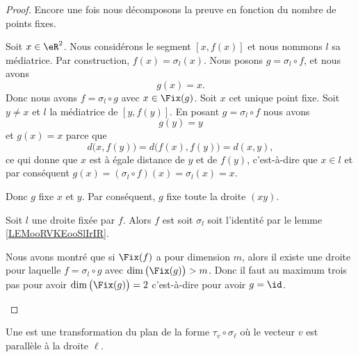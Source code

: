 \begin{proof}
	Encore une fois nous décomposons la preuve en fonction du nombre de points fixes.
	\begin{subproof}
		Soit \( x\in \eR^2\). Nous considérons le segment \( [x,f(x)]\) et nous nommons \( l\) sa médiatrice. Par construction, \( f(x)=\sigma_l(x)\). Nous posons \( g=\sigma_l\circ f\), et nous avons
		\begin{equation}
			g(x)=x.
		\end{equation}
		Donc nous avons \( f=\sigma_l\circ g\) avec \( x\in\Fix(g)\).
		Soit \( x\) cet unique point fixe. Soit \( y\neq x\) et \( l\) la médiatrice de \( [y,f(y)]\). En posant \( g=\sigma_l\circ f\) nous avons
		\begin{equation}
			g(y)=y
		\end{equation}
		et \( g(x)=x\) parce que
		\begin{equation}
			d\big( x,f(y) \big)=d\big( f(x),f(y) \big)=d(x,y),
		\end{equation}
		ce qui donne que \( x\) est à égale distance de \( y\) et de \( f(y)\), c'est-à-dire que \( x\in l\) et par conséquent \( g(x)=(\sigma_l\circ f)(x)=\sigma_l(x)=x\).

		Donc \( g\) fixe \( x\) et \( y\). Par conséquent, \( g\) fixe toute la droite \( (xy)\).

		Soit \( l\) une droite fixée par \( f\). Alors \( f\) est soit \( \sigma_l\) soit l'identité par le lemme \ref{LEMooRVKEooSlIrIR}.

		\spitem[Conclusion]

		Nous avons montré que si \( \Fix(f)\) a pour dimension \( m\), alors il existe une droite pour laquelle \( f=\sigma_l\circ g\) avec \( \dim\big( \Fix(g) \big)>m\). Donc il faut au maximum trois pas pour avoir \( \dim\big( \Fix(g) \big)=2\) c'est-à-dire pour avoir \( g=\id\).
	\end{subproof}
\end{proof}

\begin{definition}      \label{DEFooJEOYooNwYtuQ}
	Une  est une transformation du plan de la forme \( \tau_v\circ\sigma_{\ell}\) où le vecteur \( v\) est parallèle à la droite \( \ell\).
\end{definition}

